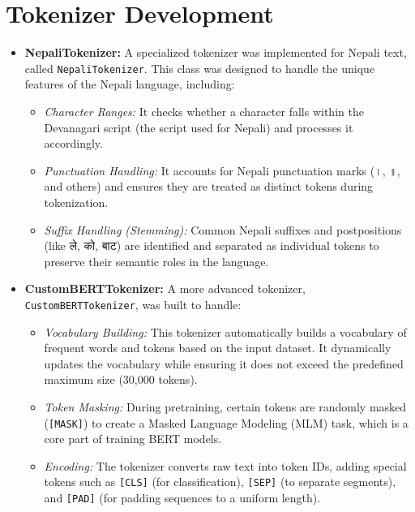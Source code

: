 \section{Tokenizer Development}
\begin{itemize}
    \item \textbf{NepaliTokenizer:} A specialized tokenizer was implemented for Nepali text, called \texttt{NepaliTokenizer}. This class was designed to handle the unique features of the Nepali language, including:
    \begin{itemize}
        \item \textit{Character Ranges:} It checks whether a character falls within the Devanagari script (the script used for Nepali) and processes it accordingly.
        \item \textit{Punctuation Handling:} It accounts for Nepali punctuation marks (\textsanskrit{।}, \textsanskrit{॥}, and others) and ensures they are treated as distinct tokens during tokenization.
        \item \textit{Suffix Handling (Stemming):} Common Nepali suffixes and postpositions (like \textsanskrit{ले}, \textsanskrit{को}, \textsanskrit{बाट}) are identified and separated as individual tokens to preserve their semantic roles in the language.
    \end{itemize}
    \item \textbf{CustomBERTTokenizer:} A more advanced tokenizer, \texttt{CustomBERTTokenizer}, was built to handle:
    \begin{itemize}
        \item \textit{Vocabulary Building:} This tokenizer automatically builds a vocabulary of frequent words and tokens based on the input dataset. It dynamically updates the vocabulary while ensuring it does not exceed the predefined maximum size (30,000 tokens).
        \item \textit{Token Masking:} During pretraining, certain tokens are randomly masked (\texttt{[MASK]}) to create a Masked Language Modeling (MLM) task, which is a core part of training BERT models.
        \item \textit{Encoding:} The tokenizer converts raw text into token IDs, adding special tokens such as \texttt{[CLS]} (for classification), \texttt{[SEP]} (to separate segments), and \texttt{[PAD]} (for padding sequences to a uniform length).
    \end{itemize}
\end{itemize}

